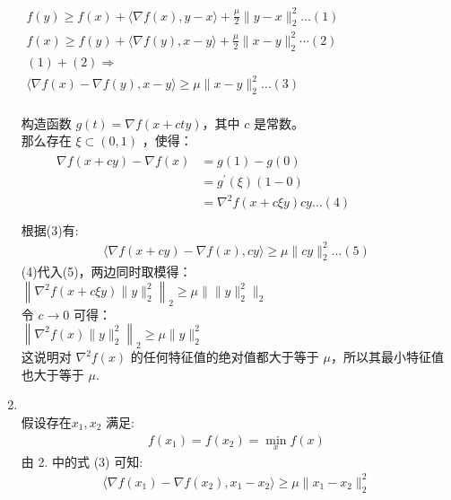 \documentclass[11pt,letter,notitlepage]{article}
\begin{document}
\begin{solution}
\begin{enumerate}
        $\begin{array}{l}{f(y) \geq f(x)+\langle\nabla f(x), y-x\rangle+\frac{\mu}{2}\|y-x\|_{2}^{2} \ldots (1)} \\ {f(x) \geq f(y)+\langle\nabla f(y), x-y\rangle+\frac{\mu}{2}\|x-y\|_{2}^{2} \cdots (2)} \\ {(1)+(2) \Rightarrow} \\ {\langle\nabla f(x)-\nabla f(y), x-y\rangle \geqslant \mu\|x-y\|_{2}^{2} \ldots (3)}\end{array}$\\ \ \\
        构造函数 $g(t)= \nabla f(x+c t y)$，其中 $c$ 是常数。\\
        那么存在 $\xi \subset (0,1)$ ，使得：\\
        $\begin{array}{l}{\qquad \begin{aligned}  \nabla f(x+c y)-\nabla f(x) &=g(1)-g(0) \\ &=g^{\prime}\left(\xi \right)(1-0) \\ &=\nabla^{2} f(x+c\xi y)c y \ldots (4)\end{aligned}} \\  \end{array}$\\
        根据(3)有:
        \begin{align*}
            \langle\nabla f(x + cy)-\nabla f(x), cy\rangle \geqslant \mu\|cy\|_{2}^{2} \ldots (5)
        \end{align*}
        (4)代入(5)，两边同时取模得：\\
        $ \left\|\nabla^{2} f(x+c \xi y) \|y\|_{2}^{2}\right\|_2 \geq \mu \| \|y \|_{2}^{2} \|_2$\\
        令 $c \rightarrow 0$ 可得：\\
        $ \left\|\nabla^{2} f(x) \|y\|_{2}^{2}\right\|_2 \geq \mu\|y\|_{2}^{2}$\\
        这说明对 $\nabla^{2}f(x)$ 的任何特征值的绝对值都大于等于 $\mu$，所以其最小特征值也大于等于 $\mu$.
        \item \ \\
        假设存在$x_1, x_2$ 满足:\\
        \begin{align*}
            f(x_1) = f(x_2) = \min_{x}f(x)
        \end{align*}
        由 2. 中的式 (3) 可知:\\
        \begin{align*}
            \langle\nabla f(x_1)-\nabla f(x_2), x_1-x_2\rangle \geqslant \mu\|x_1-x_2\|_{2}^{2}

\end{align*}
\end{enumerate}
\end{solution}
\end{document}
